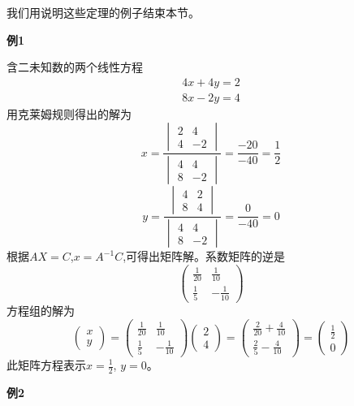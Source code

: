 我们用说明这些定理的例子结束本节。

\textbf{例1}

含二未知数的两个线性方程
\[\begin{array}{c}
    4x+4y=2 \\ 8x-2y=4
\end{array}\]
用克莱姆规则得出的解为
\[x=\frac{
\begin{vmatrix}
    2 & 4 \\
    4 & -2
\end{vmatrix}
}{
\begin{vmatrix}
    4 & 4 \\
    8 & -2
\end{vmatrix}
}
=\frac{-20}{-40}=\frac{1}{2}\]
\[y=\frac{
\begin{vmatrix}
    4 & 2 \\
    8 & 4
\end{vmatrix}
}{
\begin{vmatrix}
    4 & 4 \\
    8 & -2
\end{vmatrix}
}
=\frac{0}{-40}=0\]
根据$AX=C$,$x=A^{-1}C$,可得出矩阵解。系数矩阵的逆是
\[
\begin{pmatrix}
    \frac{1}{20} & \frac{1}{10} \\
    \frac{1}{5} & -\frac{1}{10} 
\end{pmatrix}    
\]
方程组的解为
\[
\begin{pmatrix}
    x \\ y 
\end{pmatrix} 
=
\begin{pmatrix}
    \frac{1}{20} & \frac{1}{10} \\
    \frac{1}{5} & -\frac{1}{10} 
\end{pmatrix}  
\begin{pmatrix}
    2 \\ 4 
\end{pmatrix} 
=
\begin{pmatrix}
    \frac{2}{20}+\frac{4}{10} \\
    \frac{2}{5}-\frac{4}{10} 
\end{pmatrix} 
=
\begin{pmatrix}
    \frac{1}{2} \\ 0 
\end{pmatrix} 
\]
此矩阵方程表示$x=\frac{1}{2}$, $y=0$。

\textbf{例2}

